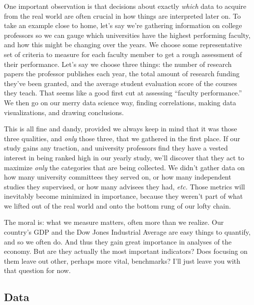 One important observation is that decisions about exactly \textit{which} data
to acquire from the real world are often crucial in how things are interpreted
later on. To take an example close to home, let's say we're gathering
information on college professors so we can gauge which universities have the
highest performing faculty, and how this might be changing over the years. We
choose some representative set of criteria to measure for each faculty member
to get a rough assessment of their performance. Let's say we choose three
things: the number of research papers the professor publishes each year, the
total amount of research funding they've been granted, and the average student
evaluation score of the courses they teach. That seems like a good first cut at
assessing ``faculty performance.'' We then go on our merry data science way,
finding correlations, making data visualizations, and drawing conclusions.

This is all fine and dandy, provided we always keep in mind that it was those
three qualities, and \textit{only} those three, that we gathered in the first
place. If our study gains any traction, and university professors find they
have a vested interest in being ranked high in our yearly study, we'll discover
that they act to maximize \textit{only} the categories that are being
collected. We didn't gather data on how many university committees they served
on, or how many independent studies they supervised, or how many advisees they
had, \textit{etc.} Those metrics will inevitably become minimized in
importance, because they weren't part of what we lifted out of the real world
and onto the bottom rung of our lofty chain.


The moral is: what we measure matters, often more than we realize. Our
country's GDP and the Dow Jones Industrial Average are easy things to quantify,
and so we often do. And thus they gain great importance in analyses of the
economy. But are they actually the most important indicators? Does focusing on
them leave out other, perhaps more vital, benchmarks? I'll just leave you with
that question for now.

\subsection{Data}


